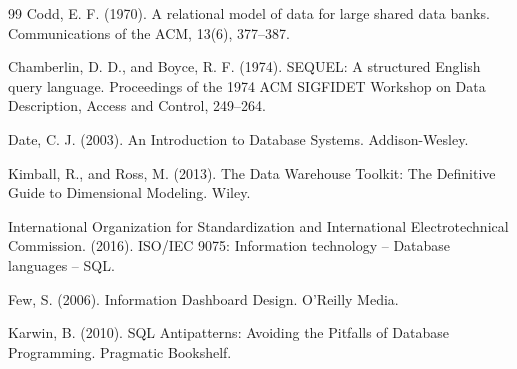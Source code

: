 \documentclass[UTF8,fontset=fandol,openany,zihao=-4]{ctexbook}
\begin{document}
\begin{thebibliography}{99}
Codd, E. F. (1970).
\newblock A relational model of data for large shared data banks.
\newblock Communications of the ACM, 13(6), 377--387.

Chamberlin, D. D., and Boyce, R. F. (1974).
\newblock SEQUEL: A structured English query language.
\newblock Proceedings of the 1974 ACM SIGFIDET Workshop on Data Description, Access and Control, 249--264.

Date, C. J. (2003).
\newblock An Introduction to Database Systems.
\newblock Addison-Wesley.

Kimball, R., and Ross, M. (2013).
\newblock The Data Warehouse Toolkit: The Definitive Guide to Dimensional Modeling.
\newblock Wiley.

International Organization for Standardization and International Electrotechnical Commission. (2016).
\newblock ISO/IEC 9075: Information technology -- Database languages -- SQL.

Few, S. (2006).
\newblock Information Dashboard Design.
\newblock O'Reilly Media.

Karwin, B. (2010).
\newblock SQL Antipatterns: Avoiding the Pitfalls of Database Programming.
\newblock Pragmatic Bookshelf.
\end{thebibliography}
\end{document}
